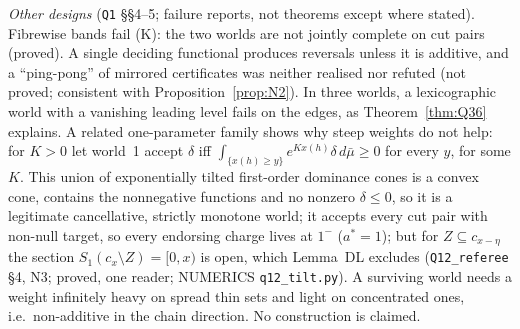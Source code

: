 \documentclass[11pt]{article}
\theoremstyle{definition}
\theoremstyle{remark}
\newcommand{\src}[1]{\texttt{#1}}
\begin{document}
\emph{Other designs} (\src{Q1} \S\S4--5; failure reports, not theorems except where stated). Fibrewise bands fail (K): the two worlds are not jointly complete on cut pairs (proved). A single deciding functional produces reversals unless it is additive, and a ``ping-pong'' of mirrored certificates was neither realised nor refuted (not proved; consistent with Proposition~\ref{prop:N2}). In three worlds, a lexicographic world with a vanishing leading level fails on the edges, as Theorem~\ref{thm:Q36} explains. A related one-parameter family shows why steep weights do not help: for $K>0$ let world~1 accept $\delta$ iff $\int_{\{x(h)\ge y\}}e^{Kx(h)}\delta\,d\bar\mu\ge0$ for every $y$, for some $K$. This union of exponentially tilted first-order dominance cones is a convex cone, contains the nonnegative functions and no nonzero $\delta\le0$, so it is a legitimate cancellative, strictly monotone world; it accepts every cut pair with non-null target, so every endorsing charge lives at $1^-$ ($a^*=1$); but for $Z\subseteq c_{x-\eta}$ the section $S_1(c_x\setminus Z)=[0,x)$ is open, which Lemma~DL excludes (\src{Q12\_referee} \S4, N3; proved, one reader; NUMERICS \src{q12\_tilt.py}). A surviving world needs a weight infinitely heavy on spread thin sets and light on concentrated ones, i.e.\ non-additive in the chain direction. No construction is claimed.
\end{document}
